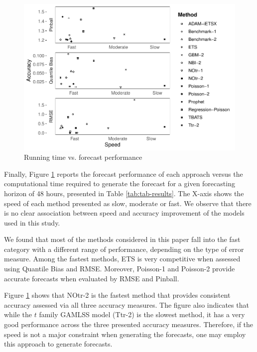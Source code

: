 \documentclass[]{elsarticle} %
\begin{document}
\begin{figure}[H]

{\centering \includegraphics[width=0.7\linewidth]{paper_files/figure-latex/time-accuracy-1} 

}

\caption{Running time vs. forecast performance}\label{fig:time-accuracy}
\end{figure}

Finally, Figure \ref{fig:time-accuracy} reports the forecast
performance of each approach versus the computational time required to
generate the forecast for a given forecasting horizon of 48 hours,
presented in Table \ref{tab:tab-results}. The X-axis shows the speed of
each method presented as slow, moderate or fast. We observe that there
is no clear association between speed and accuracy improvement of the
models used in this study.

We found that most of the methods considered in this paper fall into the
fast category with a different range of performance, depending on the
type of error measure. Among the fastest methods, ETS is very
competitive when assessed using Quantile Bias and RMSE. Moreover,
Poisson-1 and Poisson-2 provide accurate forecasts when evaluated by
RMSE and Pinball.

Figure \ref{fig:time-accuracy} shows that NOtr-2 is the fastest method
that provides consistent accuracy assessed via all three accuracy
measures. The figure also indicates that while the \(t\) family GAMLSS
model (Ttr-2) is the slowest method, it has a very good performance
across the three presented accuracy measures. Therefore, if the speed is
not a major constraint when generating the forecasts, one may employ
this approach to generate forecasts.
\end{document}
